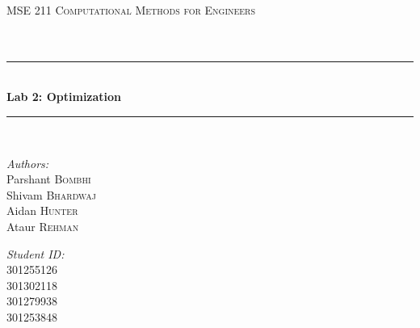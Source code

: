 \documentclass[12pt]{article}
\begin{document}
\begin{titlepage}

\newcommand{\HRule}{\rule{\linewidth}{0.5mm}} %

\center %
 

\textsc{\LARGE MSE 211 Computational Methods for Engineers}\\[1.5cm] %
\textsc{\Large }\\[0.5cm] %
\textsc{\large }\\[0.5cm] %


\HRule \\[0.4cm]
{ \huge \bfseries Lab 2: Optimization}\\[0.4cm] %
\HRule \\[1.5cm]
 

\begin{minipage}{0.4\textwidth}
    \begin{flushleft} \large
        \emph{Authors:}\\
        Parshant \textsc{Bombhi}\\
        Shivam \textsc{Bhardwaj}\\
        Aidan \textsc{Hunter}\\
        Ataur \textsc{Rehman}
    \end{flushleft}
\end{minipage}
\hfill
\begin{minipage}{0.4\textwidth}
    \begin{flushright} \large
        \emph{Student ID:} \\
        301255126\\
        301302118\\
        301279938\\
        301253848
    \end{flushright}
\end{minipage}
\vspace{10mm}


\end{titlepage}
\end{document}
